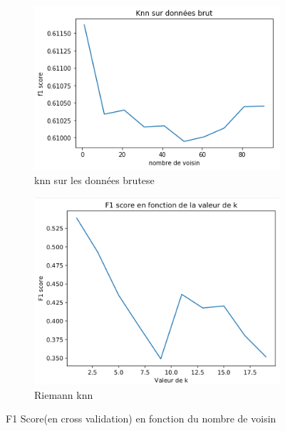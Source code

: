 \documentclass{article}[12pt]
\begin{document}
\begin{figure}[h]
        \centering
        \begin{subfigure}[b]{0.475\textwidth}
            \centering
            \includegraphics[width=\textwidth]{images/f1_score_knn_brut.png}
            \caption[Network2]%
            {{\small  knn sur les données brutese}}    
            \label{fig:mean and std of net14}
        \end{subfigure}
        \hfill
        \begin{subfigure}[b]{0.475\textwidth}  
            \centering 
            \includegraphics[width=\textwidth]{images/riemannKNN_valeur_de_k_brain_invader.png}
            \caption[]%
            {{\small Riemann knn  }}    
            \label{fig:mean and std of net24}
        \end{subfigure}
        \caption[ Visualisation des classes]
        {\small F1 Score(en cross validation) en fonction du nombre de voisin } 
        \label{fig:mean and std of nets}
    \end{figure}
    
\end{document}
